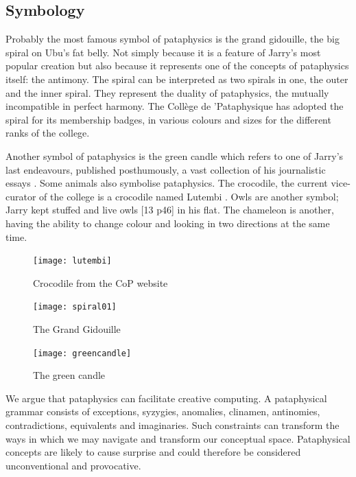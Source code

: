 \subsection{Symbology}

Probably the most famous symbol of pataphysics is the grand gidouille, the big spiral on Ubu's fat belly. Not simply because it is a feature of Jarry's most popular creation but also because it represents one of the concepts of pataphysics itself: the antimony. The spiral can be interpreted as two spirals in one, the outer and the inner spiral. They represent the duality of pataphysics, the mutually incompatible in perfect harmony. The Collège de 'Pataphysique has adopted the spiral for its membership badges, in various colours and sizes for the different ranks of the college.

Another symbol of pataphysics is the green candle which refers to one of Jarry's last endeavours, published posthumously, a vast collection of his journalistic essays \citep{Hugill2012}. Some animals also symbolise pataphysics. The crocodile, the current vice-curator of the college is a crocodile named Lutembi \citep{Hugill2012}. Owls are another symbol; Jarry kept stuffed and live owls \citep[p.46]{Brotchie2011}[13 p46] in his flat. The chameleon is another, having the ability to change colour and looking in two directions at the same time.

\begin{figure}[htb]
  \centering
  \begin{minipage}{.275\linewidth}
    \texttt{[image: lutembi]}
  \caption[Crocodile]{Crocodile from the CoP website}
  \label{img1}
  \end{minipage}
  \hspace{.05\linewidth}
  \begin{minipage}{.275\linewidth}
    \texttt{[image: spiral01]}
  \caption[Gidouille]{The Grand Gidouille}
  \label{img2}
  \end{minipage}
  \hspace{.05\linewidth}
  \begin{minipage}{.275\linewidth}
    \texttt{[image: greencandle]}
  \caption[Green Candle]{The green candle}
  \label{img3}
  \end{minipage}
\end{figure}

\begin{draft}
  We argue that pataphysics can facilitate creative computing. A pataphysical grammar consists of exceptions, syzygies, anomalies, clinamen, antinomies, contradictions, equivalents and imaginaries. Such constraints can transform the ways in which we may navigate and transform our conceptual space. Pataphysical concepts are likely to cause surprise and could therefore be considered unconventional and provocative.
\end{draft}


